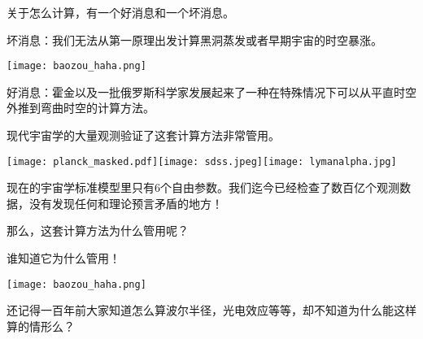 \documentclass[CJK]{beamer}
\begin{document}
\begin{frame}
\bch
关于{\blue 怎么计算}，有一个好消息和一个坏消息。
\ech
\end{frame}

\begin{frame}
\bch
\begin{minipage}{0.6\textwidth}
坏消息：我们无法从第一原理出发计算黑洞蒸发或者早期宇宙的时空暴涨。
\end{minipage}
\begin{minipage}{0.3\textwidth}
\texttt{[image: baozou\_haha.png]}
\end{minipage}

\skipline
\skipline

好消息：霍金以及一批俄罗斯科学家发展起来了一种在特殊情况下可以从平直时空外推到弯曲时空的计算方法。
\ech
\end{frame}


\begin{frame}
\bch
现代宇宙学的大量观测验证了这套计算方法非常管用。

\texttt{[image: planck\_masked.pdf]}\texttt{[image: sdss.jpeg]}\texttt{[image: lymanalpha.jpg]}

现在的宇宙学标准模型里只有6个自由参数。我们迄今已经检查了数百亿个观测数据，没有发现任何和理论预言矛盾的地方！

\skipline
\skipline
那么，这套计算方法为什么管用呢？
\ech
\end{frame}


\begin{frame}
\bch
\begin{minipage}{0.6\textwidth}
谁知道它为什么管用！
\end{minipage}
\begin{minipage}{0.3\textwidth}
\texttt{[image: baozou\_haha.png]}
\end{minipage}

\skipline
\skipline
\skipline
\skipline
还记得一百年前大家知道怎么算波尔半径，光电效应等等，却不知道为什么能这样算的情形么？
\ech
\end{frame}
\end{document}
